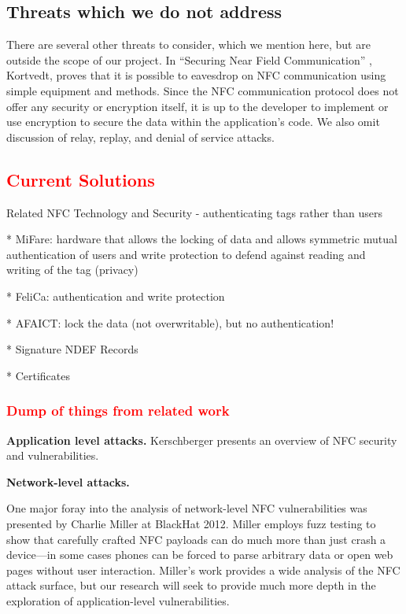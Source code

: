 \documentclass[12pt]{article}
\newcommand\TODO[1]{\textcolor{red}{#1}}
\begin{document}
\subsection{Threats which we do not address}
There are several other threats to consider, which we mention here, but are outside the scope of our project.
In ``Securing Near Field Communication'' \cite{kortvedt2009}, Kortvedt, proves that it is possible to eavesdrop on NFC communication using simple equipment and methods.
Since the NFC communication protocol does not offer any security or encryption itself, it is up to the developer to implement or use encryption to secure the data within the application's code. 
We also omit discussion of relay, replay, and denial of service attacks.


\TODO{\subsection{Current Solutions}}
Related NFC Technology and Security - authenticating tags rather than users

* MiFare: hardware that allows the locking of data and allows symmetric mutual authentication of users and write protection to defend against reading and writing of the tag (privacy)

* FeliCa: authentication and write protection 

* AFAICT: lock the data (not overwritable), but no authentication!

* Signature NDEF Records

* Certificates 

\subsubsection{ \TODO{Dump of things from related work}}
\textbf{Application level attacks.}
Kerschberger\cite{kerschberger2011} presents an overview of NFC security and vulnerabilities.


\textbf{Network-level attacks.}

One major foray into the analysis of network-level NFC vulnerabilities was presented by Charlie Miller at BlackHat 2012\cite{miller2012}.
Miller employs fuzz testing to show that carefully crafted NFC payloads can do much more than just crash a device---in some cases phones can be forced to parse arbitrary data or open web pages without user interaction.
Miller's work provides a wide analysis of the NFC attack surface, but our research will seek to provide much more depth in the exploration of application-level vulnerabilities.
\end{document}
